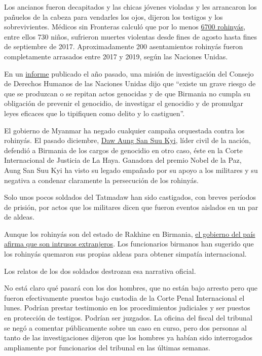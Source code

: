 Los ancianos fueron decapitados y las chicas jóvenes violadas y les
arrancaron los pañuelos de la cabeza para vendarles los ojos, dijeron
los testigos y los sobrevivientes. Médicos sin Fronteras calculó que por
lo menos
\href{https://www.nytimes3xbfgragh.onion/2017/12/14/world/asia/myanmar-rohingya-deaths.html}{6700
rohinyás}, entre ellos 730 niños, sufrieron muertes violentas desde
fines de agosto hasta fines de septiembre de 2017. Aproximadamente 200
asentamientos rohinyás fueron completamente arrasados entre 2017 y 2019,
según las Naciones Unidas.

En un
\href{https://www.ohchr.org/Documents/HRBodies/HRCouncil/FFM-Myanmar/20190916/A_HRC_42_CRP.5.pdf}{informe}
publicado el año pasado, una misión de investigación del Consejo de
Derechos Humanos de las Naciones Unidas dijo que ``existe un grave
riesgo de que se produzcan o se repitan actos genocidas y de que
Birmania no cumpla su obligación de prevenir el genocidio, de investigar
el genocidio y de promulgar leyes eficaces que lo tipifiquen como delito
y lo castiguen''.

El gobierno de Myanmar ha negado cualquier campaña orquestada contra los
rohinyás. El pasado diciembre,
\href{https://www.nytimes3xbfgragh.onion/2019/12/10/world/asia/aung-san-suu-kyi-myanmar-genocide-hague.html}{Daw
Aung San Suu Kyi}, líder civil de la nación, defendió a Birmania de los
cargos de genocidio en otro caso, éste en la Corte Internacional de
Justicia de La Haya. Ganadora del premio Nobel de la Paz, Aung San Suu
Kyi ha visto su legado empañado por su apoyo a los militares y su
negativa a condenar claramente la persecución de los rohinyás.

Solo unos pocos soldados del Tatmadaw han sido castigados, con breves
períodos de prisión, por actos que los militares dicen que fueron
eventos aislados en un par de aldeas.

Aunque los rohinyás son del estado de Rakhine en Birmania,
\href{https://www.nytimes3xbfgragh.onion/2017/10/24/world/asia/myanmar-rohingya-ethnic-cleansing.html}{el
gobierno del país afirma que son intrusos extranjeros}. Los funcionarios
birmanos han sugerido que los rohinyás quemaron sus propias aldeas para
obtener simpatía internacional.

Los relatos de los dos soldados destrozan esa narrativa oficial.

No está claro qué pasará con los dos hombres, que no están bajo arresto
pero que fueron efectivamente puestos bajo custodia de la Corte Penal
Internacional el lunes. Podrían prestar testimonio en los procedimientos
judiciales y ser puestos en protección de testigos. Podrían ser
juzgados. La oficina del fiscal del tribunal se negó a comentar
públicamente sobre un caso en curso, pero dos personas al tanto de las
investigaciones dijeron que los hombres ya habían sido interrogados
ampliamente por funcionarios del tribunal en las últimas semanas.

